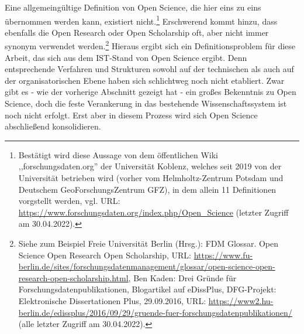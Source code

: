 Eine allgemeingültige Definition von Open Science, die hier eins zu eins übernommen werden kann, existiert nicht.\footnote{Bestätigt wird diese Aussage von dem öffentlichen Wiki ,,forschungsdaten.org'' der Universität Koblenz, welches seit 2019 von der Universität betrieben wird (vorher vom Helmholtz-Zentrum Potsdam und Deutschem GeoForschungsZentrum GFZ), in dem allein 11 Definitionen vorgstellt werden, vgl. URL: \url{https://www.forschungsdaten.org/index.php/Open_Science} (letzter Zugriff am 30.04.2022).} Erschwerend kommt hinzu, dass ebenfalls die Open Research oder Open Scholarship oft, aber nicht immer synonym verwendet werden.\footnote{Siehe zum Beispiel Freie Universität Berlin (Hrsg.): FDM Glossar. Open Science\/ Open Research\/ Open Scholarship, URL: \url{https://www.fu-berlin.de/sites/forschungsdatenmanagement/glossar/open-science-open-research-open-scholarship.html}, Ben Kaden: Drei Gründe für Forschungsdatenpublikationen, Blogartikel auf eDissPlus, DFG-Projekt: Elektronische Dissertationen Plus, 29.09.2016, URL: \url{https://www2.hu-berlin.de/edissplus/2016/09/29/gruende-fuer-forschungsdatenpublikationen/} (alle letzter Zugriff am 30.04.2022).} Hieraus ergibt sich ein Definitionsproblem für diese Arbeit, das sich aus dem IST-Stand von Open Science ergibt. Denn entsprechende Verfahren und Strukturen sowohl auf der technischen als auch auf der organisatorischen Ebene haben sich schlichtweg noch nicht etabliert. Zwar gibt es - wie der vorherige Abschnitt gezeigt hat - ein großes Bekenntnis zu Open Science, doch die feste Verankerung in das bestehende Wissenschaftssystem ist noch nicht erfolgt. Erst aber in diesem Prozess wird sich Open Science abschließend konsolidieren. 

